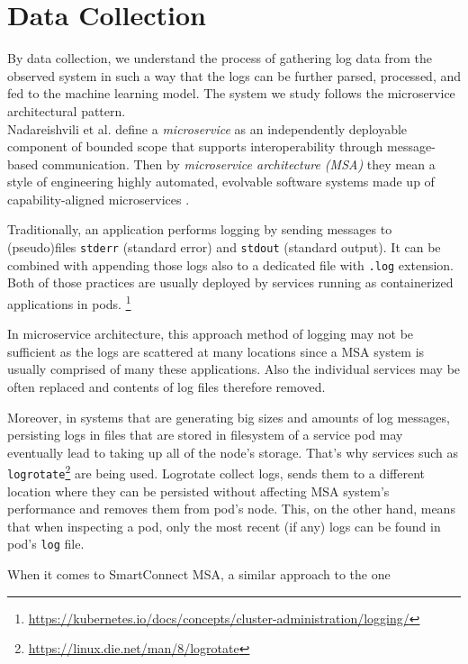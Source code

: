 \section{Data Collection}
By data collection, we understand the process of gathering log data from the observed system in such a way that the logs can be further parsed, processed, and fed to the machine learning model.
The system we study follows the microservice architectural pattern.\\
Nadareishvili et al. \cite{nadareishvili2016microservice} define a \textit{microservice} as an independently deployable component of bounded scope that supports interoperability through message-based communication. Then by \textit{microservice architecture (MSA)} they mean a style of engineering highly automated, evolvable software systems made up of capability-aligned microservices \cite{nadareishvili2016microservice}. 

Traditionally, an application performs logging by sending messages to\\
(pseudo)files \texttt{stderr} (standard error) and \texttt{stdout} (standard output). It can be combined with appending those logs also to a dedicated file with \texttt{.log} extension. Both of those practices are usually deployed by services running as containerized applications in pods. \footnote{\url{https://kubernetes.io/docs/concepts/cluster-administration/logging/}}

In microservice architecture, this approach method of logging may not be sufficient as the logs are scattered at many locations since a MSA system is usually comprised of many these applications. Also the individual services may be often replaced and contents of log files therefore removed.

Moreover, in systems that are generating big sizes and amounts of log messages, persisting logs in files that are stored in filesystem of a service pod may eventually lead to taking up all of the node's storage. 
That's why services such as \texttt{logrotate}\footnote{\url{https://linux.die.net/man/8/logrotate}} are being used. Logrotate collect logs, sends them to a different location where they can be persisted without affecting MSA system's performance and removes them from pod's node. 
This, on the other hand, means that when inspecting a pod, only the most recent (if any) logs can be found in pod's \texttt{log} file.

When it comes to SmartConnect MSA, a similar approach to the one 



